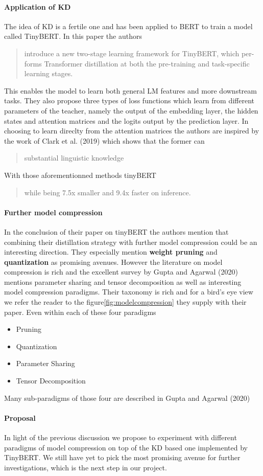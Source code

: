 \documentclass{article}
\begin{document}
\paragraph{Application of KD} The idea of KD is a fertile one and has been
applied to BERT to train a model called TinyBERT\cite{tinybert}. In this paper
the authors \blockcquote{tinybert}{introduce a new two-stage learning framework
for TinyBERT, which per- forms Transformer distillation at both the pre-training
and task-specific learning stages.} This enables the model to learn both general
LM features and more downstream tasks. They also propose three types of loss
functions which learn from different parameters of the teacher, namely the
output of the embedding layer, the hidden states and attention matrices and the
logits output by the prediction layer. In choosing to learn direclty from the
attention matrices the authors are inspired by the work of Clark et al.
(2019)\cite{whatdoesbertlookat} which shows that the former can
\blockcquote{tinybert}{substantial linguistic knowledge}. With those
aforementionned methods tinyBERT \blockcquote{tinybert}{while being
7.5x smaller and 9.4x faster on inference.}


\paragraph{Further model compression} In the conclusion of their paper on
tinyBERT the authors mention that combining their distillation strategy with
further model compression could be an interesting direction. They especially
mention \textbf{weight pruning} and \textbf{quantization} as promising avenues.
However the literature on model compression is rich and the excellent survey by
Gupta and Agarwal (2020) \cite{gupta2020compression} mentions parameter sharing
and tensor decomposition as well as interesting model compression paradigms.
Their taxonomy is rich and for a bird's eye view we refer the reader to the
figure\ref{fig:modelcompression} they supply with their paper. Even within
each of these four paradigms
\begin{itemize}
  \item Pruning
  \item Quantization
  \item Parameter Sharing
  \item Tensor Decomposition
\end{itemize}
Many sub-paradigms of those four are described in Gupta and Agarwal (2020)

\paragraph{Proposal} In light of the previous discussion we propose to
experiment with different paradigms of model compression on top of the KD based
one implemented by TinyBERT. We still have yet to pick the most promising avenue
for further investigations, which is the next step in our project.
\end{document}
